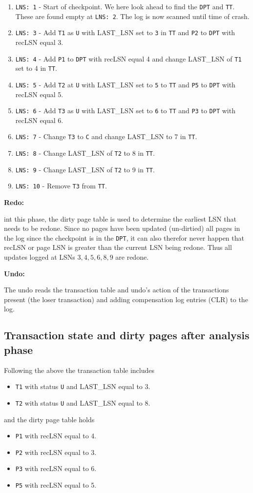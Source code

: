 \begin{enumerate}
\item {\tt LNS: 1} - Start of checkpoint. We here look ahead to find the
{\tt DPT} and {\tt TT}. These are found empty at {\tt LNS: 2}. The log is now
scanned until time of crash.
\item {\tt LNS: 3} - Add {\tt T1} as {\tt U} with LAST\_LSN set to {\tt 3} in {\tt TT} and {\tt P2} to {\tt DPT} with recLSN equal 3.
\item {\tt LNS: 4} - Add {\tt P1} to {\tt DPT} with recLSN equal 4 and change LAST\_LSN of
    {\tt T1} set to 4 in {\tt TT}.
\item {\tt LNS: 5} - Add {\tt T2} at {\tt U} with LAST\_LSN set to {\tt 5}
    to {\tt TT} and {\tt P5} to {\tt DPT} with recLSN equal 5.
\item {\tt LNS: 6} - Add {\tt T3} as {\tt U} with LAST\_LSN set to {\tt 6}
    to {\tt TT} and {\tt P3} to {\tt DPT}  with recLSN equal 6.
\item {\tt LNS: 7} - Change {\tt T3} to {\tt C} and change LAST\_LSN to 7 in {\tt TT}.
\item {\tt LNS: 8} - Change LAST\_LSN of {\tt T2} to 8 in {\tt TT}.
\item {\tt LNS: 9} - Change LAST\_LSN of {\tt T2} to 9 in {\tt TT}.
\item {\tt LNS: 10} - Remove {\tt T3} from {\tt TT}.
\end{enumerate}

\noindent
{\bf Redo:}

int this phase, the dirty page table is used to determine the earliest LSN that needs to be redone. Since no pages have been updated (un-dirtied) all pages in the log since the checkpoint is in the {\tt DPT}, it can also therefor never happen that recLSN or page LSN is greater than the current LSN being redone. Thus all updates logged at LSNs $3,4,5,6,8,9$ are redone.

\noindent
{\bf Undo:}

The undo reads the transaction table and undo's action of the transactions present (the loser transaction) and adding compensation log entries (CLR) to the log.

\subsection{Transaction state and dirty pages after analysis phase}
Following the above the transaction table includes
\begin{itemize}
\item {\tt T1} with status {\tt U} and LAST\_LSN equal to 3.
\item {\tt T2} with status {\tt U} and LAST\_LSN equal to 8.
\end{itemize}
and the dirty page table holds
\begin{itemize}
\item {\tt P1} with recLSN equal to 4.
\item {\tt P2} with recLSN equal to 3.
\item {\tt P3} with recLSN equal to 6.
\item {\tt P5} with recLSN equal to 5.
\end{itemize}

